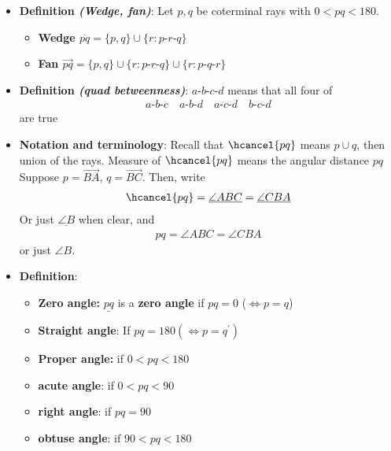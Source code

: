 \documentclass{report}
\begin{document}
\begin{itemize}
        \item \textbf{Definition \textit{(Wedge, fan)}}: Let $p,q$ be coterminal rays with $0<pq<180$.
            \begin{itemize}
                \item \textbf{Wedge $\overline{pq} = \{p,q\} \cup \{r: p\text{-}r\text{-}q\}$}
                \item \textbf{Fan $\overrightarrow{pq} = \{p,q\} \cup \{r: p\text{-}r\text{-}q\} \cup \{r: p\text{-}q\text{-}r\}$}
            \end{itemize}
        \item \textbf{Definition \textit{(quad betweenness)}}: $ a\text{-}b\text{-}c\text{-}d $ means that all four of 
            \begin{align*}
                a\text{-}b\text{-}c \quad a\text{-}b\text{-}d \quad a\text{-}c\text{-}d \quad b\text{-}c\text{-}d
            \end{align*}
            are true
        \item \textbf{Notation and terminology}: Recall that $\hcancel{pq}$ means $p \cup q$, then union of the rays. Measure of $\hcancel{pq} $ means the angular distance $pq$
            \bigbreak \noindent 
            Suppose $p = \overrightarrow{BA}$, $ q = \overrightarrow{BC}$. Then, write
            \begin{align*}
                \hcancel{pq} = \underline{\angle ABC} = \underline{\angle CBA}
            \end{align*}
            Or just $\underline{\angle B}$ when clear, and
            \begin{align*}
                pq = \angle ABC = \angle CBA
            \end{align*}
            or just $\angle B$.
        \item \textbf{Definition}: 
            \begin{itemize}
                \item \textbf{Zero angle:} $\underline{pq}$ is a \textbf{zero angle} if $pq = 0 $ ($\iff p = q$)
                \item \textbf{Straight angle}: If $pq = 180 (\iff p = q^{\prime}) $
                \item \textbf{Proper angle:} if $0 < pq < 180 $
                \item \textbf{acute angle}: if $ 0 < pq < 90$
                \item \textbf{right angle}: if $ pq = 90$
                \item \textbf{obtuse angle}: if $ 90 < pq < 180$

\end{itemize}
\end{itemize}
\end{document}
